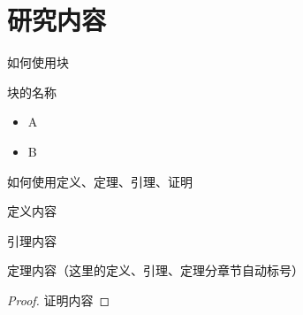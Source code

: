 \documentclass{beamer}
\begin{document}
\section{研究内容}

\begin{frame}{如何使用块}
    \begin{block}{块的名称}
        \begin{itemize}
            \item A
            \item B
        \end{itemize}
    \end{block}
\end{frame}

\begin{frame}{如何使用定义、定理、引理、证明}

    \kaishu
    \begin{define}[定义名称]
        定义内容
    \end{define}

    \begin{lem}[引理名称]
        引理内容
    \end{lem}

    \begin{thm}[定理名称]
        定理内容（这里的定义、引理、定理分章节自动标号）
    \end{thm}

    \begin{proof}
        证明内容
    \end{proof}

\end{frame}
\end{document}
